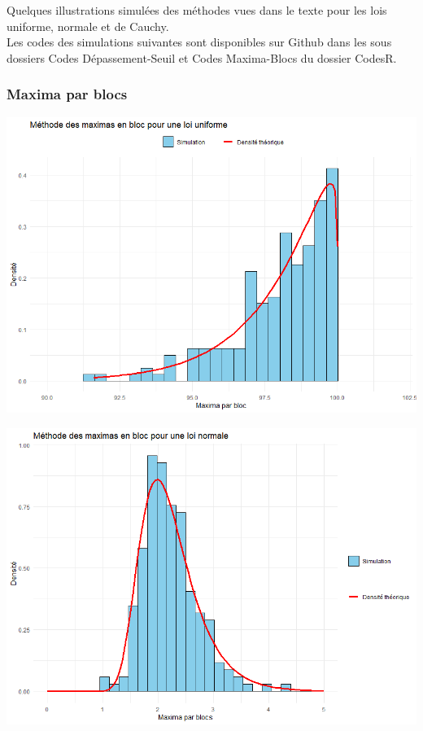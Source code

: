 \documentclass{article}
\theoremstyle{plain}
\theoremstyle{definition}
\theoremstyle{plain}
\begin{document}
\noindent Quelques illustrations simulées des méthodes vues dans le texte pour les lois uniforme, normale et de Cauchy. \\
\noindent Les codes des simulations suivantes sont disponibles sur Github dans les sous dossiers Codes Dépassement-Seuil et Codes Maxima-Blocs du dossier CodesR.

\subsubsection{Maxima par blocs}

\begin{center}
	\includegraphics[scale=0.60]{./images/MB_Uniforme} 
\end{center}

\begin{center}
	\includegraphics[scale=0.60]{./images/MB_Normale} 
\end{center}
\end{document}
